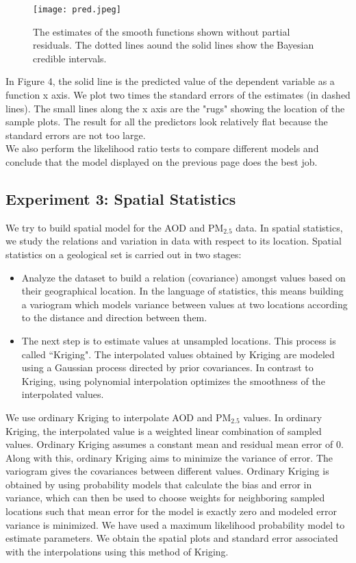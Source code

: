 \documentclass[10pt]{article}
\begin{document}
\begin{figure}[H]

\centering
\texttt{[image: pred.jpeg]} 
\caption{The estimates of the smooth functions shown without partial residuals. The dotted lines aound the solid lines show the Bayesian credible intervals.} 
\end{figure} 
In Figure 4, the solid line is the predicted value of the dependent variable as a function x axis. We plot two times the standard errors of the estimates (in dashed lines). The small lines along the x axis are the "rugs" showing the location of the sample plots. The result for all the predictors look relatively flat because the standard errors are not too large. \\ 
We also perform the likelihood ratio tests to compare different models and conclude that the model displayed on the previous page does the best job. 








\subsection{Experiment 3: Spatial Statistics}
We try to build spatial model for the AOD and PM$_{2.5}$ data. In spatial statistics, we study the relations and variation in data with respect to its location. Spatial statistics on a geological set is carried out in two stages:

\begin{itemize}
\item Analyze the dataset to build a relation (covariance) amongst values based on their geographical location. In the language of statistics, this means building a variogram which models variance between values at two locations according to the distance and direction between them.
\item The next step is to estimate values at unsampled locations. This process is called ``Kriging". The interpolated values obtained by Kriging are modeled using a Gaussian process directed by prior covariances. In contrast to Kriging, using polynomial interpolation optimizes the smoothness of the interpolated values.
\end{itemize}

We use ordinary Kriging to interpolate AOD and PM$_{2.5}$ values. In ordinary Kriging, the interpolated value is a weighted linear combination of sampled values. Ordinary Kriging assumes a constant mean and residual mean error of 0. Along with this, ordinary Kriging aims to minimize the variance of error. The variogram gives the covariances between different values. Ordinary Kriging is obtained by using probability models that calculate the bias and error in variance, which can then be used to choose weights for neighboring sampled locations such that mean error for the model is exactly zero and modeled error variance is minimized. We have used a maximum likelihood probability model to estimate parameters. We obtain the spatial plots and standard error associated with the interpolations using this method of Kriging. 
\end{document}
